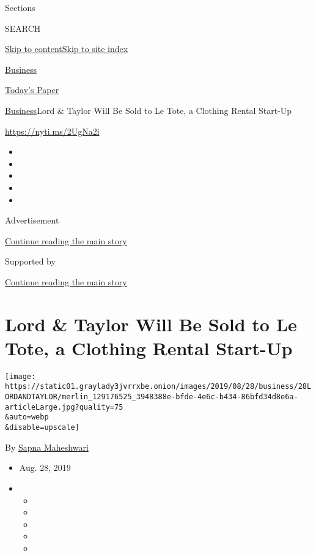 Sections

SEARCH

\protect\hyperlink{site-content}{Skip to
content}\protect\hyperlink{site-index}{Skip to site index}

\href{https://www.nytimes3xbfgragh.onion/section/business}{Business}

\href{https://myaccount.nytimes3xbfgragh.onion/auth/login?response_type=cookie\&client_id=vi}{}

\href{https://www.nytimes3xbfgragh.onion/section/todayspaper}{Today's
Paper}

\href{/section/business}{Business}\textbar{}Lord \& Taylor Will Be Sold
to Le Tote, a Clothing Rental Start-Up

\url{https://nyti.ms/2UgNa2i}

\begin{itemize}
\item
\item
\item
\item
\item
\end{itemize}

Advertisement

\protect\hyperlink{after-top}{Continue reading the main story}

Supported by

\protect\hyperlink{after-sponsor}{Continue reading the main story}

\hypertarget{lord--taylor-will-be-sold-to-le-tote-a-clothing-rental-start-up}{%
\section{Lord \& Taylor Will Be Sold to Le Tote, a Clothing Rental
Start-Up}\label{lord--taylor-will-be-sold-to-le-tote-a-clothing-rental-start-up}}

\texttt{[image: https://static01.graylady3jvrrxbe.onion/images/2019/08/28/business/28LORDANDTAYLOR/merlin\_129176525\_3948388e-bfde-4e6c-b434-86bfd34d8e6a-articleLarge.jpg?quality=75\\\&auto=webp\\\&disable=upscale]}

By \href{https://www.nytimes3xbfgragh.onion/by/sapna-maheshwari}{Sapna
Maheshwari}

\begin{itemize}
\item
  Aug. 28, 2019
\item
  \begin{itemize}
  \item
  \item
  \item
  \item
  \item
  \end{itemize}
\end{itemize}

